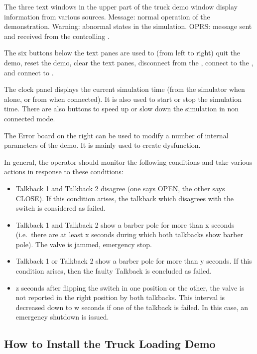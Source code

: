 The three text windows in the upper part of the truck demo window display
information from various sources. Message: normal operation of the
demonstration. Warning: abnormal states in the simulation. OPRS: message sent
and received from the controlling \CPK{}.

The six buttons below the text panes are used to (from left to right) quit the
demo, reset the demo, clear the text panes, disconnect from the \CPK{}, connect
to the \MPA{}, and connect to \CPK{}.

The clock panel displays the current simulation time (from the simulator when
alone, or from \CPK{} when connected). It is also used to start or stop the
simulation time. There are also buttons to speed up or slow down the simulation
in non connected mode.

The Error board on the right can be used to modify a number of internal
parameters of the demo. It is mainly used to create dysfunction.

In general, the operator should monitor the following conditions and take
various actions in response to these conditions:

\begin{itemize}

\item Talkback 1 and Talkback 2 disagree (one says OPEN, the other says
CLOSE). If this condition arises, the talkback which disagrees with the switch
is considered as failed.

\item Talkback 1 and Talkback 2 show a barber pole for more than x seconds
(i.e.\  there are at least x seconds during which both talkbacks show
barber pole). The valve is jammed, emergency stop.

\item Talkback 1 or Talkback 2 show a barber pole for more than y seconds.
If this condition arises, then the faulty Talkback is concluded as failed.

\item z seconds after flipping the switch in one position or the other,
the valve is not reported in the right position by both talkbacks. This
interval is decreased down to w seconds if one of the talkback is failed. In
this case, an emergency shutdown is issued.

\end{itemize}

\subsection{How to Install the Truck Loading Demo}

